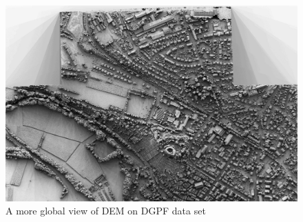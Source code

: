 \begin{figure}
\includegraphics[width=160 mm]{FIGS/SAMPLES/DGPF-GLOB.jpg}
\caption{A more global view of DEM on DGPF data set}
\end{figure}




